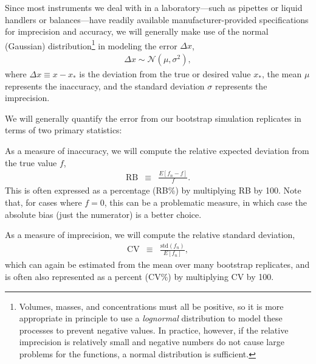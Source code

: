 \documentclass[aps,pre,twocolumn,nofootinbib,superscriptaddress,linenumbers]{revtex4-1}
\begin{document}
Since most instruments we deal with in a laboratory---such as pipettes or liquid handlers or balances---have readily available manufacturer-provided specifications for imprecision and accuracy, we will generally make use of the normal (Gaussian) distribution\footnote{Volumes, masses, and concentrations must all be positive, so it is more appropriate in principle to use a \emph{lognormal} distribution to model these processes to prevent negative values.  In practice, however, if the relative imprecision is relatively small and negative numbers do not cause large problems for the functions, a normal distribution is sufficient.} in modeling the error $\Delta x$,
\begin{eqnarray}
\Delta x \sim \mathcal{N}(\mu, \sigma^2) \label{equation:Gaussian} ,
\end{eqnarray}
where $\Delta x \equiv x - x_*$ is the deviation from the true or desired value $x_*$, the mean $\mu$ represents the inaccuracy, and the standard deviation $\sigma$ represents the imprecision.

We will generally quantify the error from our bootstrap simulation replicates in terms of two primary statistics:

As a measure of inaccuracy, we will compute the relative expected deviation from the true value $f$,
\begin{eqnarray}
\mathrm{RB} &\equiv& \frac{E[ f_n - f ]}{f} \label{equation:relative-bias} .
\end{eqnarray}
This is often expressed as a percentage (RB\%) by multiplying RB by 100.
Note that, for cases where $f = 0$, this can be a problematic measure, in which case the absolute bias (just the numerator) is a better choice.

As a measure of imprecision, we will compute the relative standard deviation,
\begin{eqnarray}
\mathrm{CV} &\equiv& \frac{\mathrm{std}(f_n)}{E[f_n]} \label{equation:relative-standard-deviation} ,
\end{eqnarray}
which can again be estimated from the mean over many bootstrap replicates, and is often also represented as a percent (CV\%) by multiplying CV by 100.

\end{document}
